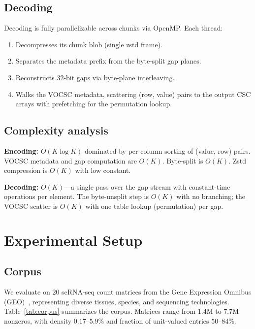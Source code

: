 \documentclass[10pt,twocolumn,letterpaper]{article}
\begin{document}
\subsection{Decoding}

Decoding is fully parallelizable across chunks via OpenMP.
Each thread:
\begin{enumerate}
\item Decompresses its chunk blob (single zstd frame).
\item Separates the metadata prefix from the byte-split gap planes.
\item Reconstructs 32-bit gaps via byte-plane interleaving.
\item Walks the VOCSC metadata, scattering (row, value) pairs to the output CSC arrays with prefetching for the permutation lookup.
\end{enumerate}

\subsection{Complexity analysis}

\textbf{Encoding:} $O(K \log K)$ dominated by per-column sorting of (value, row) pairs.
VOCSC metadata and gap computation are $O(K)$.
Byte-split is $O(K)$.
Zstd compression is $O(K)$ with low constant.

\textbf{Decoding:} $O(K)$---a single pass over the gap stream with constant-time operations per element.
The byte-unsplit step is $O(K)$ with no branching; the VOCSC scatter is $O(K)$ with one table lookup (permutation) per gap.

\section{Experimental Setup}

\subsection{Corpus}

We evaluate on 20 scRNA-seq count matrices from the Gene Expression Omnibus (GEO)~\cite{edgar2002gene}, representing diverse tissues, species, and sequencing technologies.
Table~\ref{tab:corpus} summarizes the corpus.
Matrices range from 1.4M to 7.7M nonzeros, with density $0.17$--$5.9$\% and fraction of unit-valued entries $50$--$84$\%.
\end{document}
